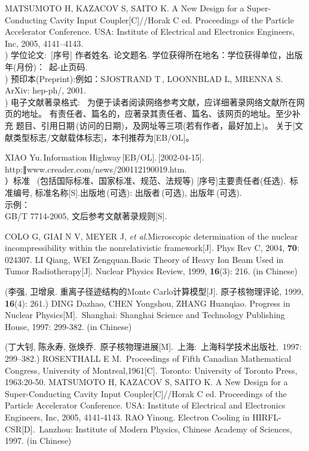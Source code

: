 \documentclass[a4paper,10.0pt,twoside]{npr}
\begin{document}
\begin{multicols}{2}
\noindent
[5] MATSUMOTO H, KAZACOV S, SAITO K. A New Design for a Super-Conducting Cavity Input Coupler[C]//Horak C ed. Proceedings of the Particle Accelerator Conference. USA: Institute of Electrical and Electronics Engineers, Inc, 2005, 4141--4143.
\\
) 学位论文\cite{master:cn}:\song ~[序号]
作者姓名. 论文题名.
学位获得所在地名：学位获得单位，出版年(月份)：\ 起-止页码.\\
) 预印本\cite{Yuqinben:pc}(Preprint):\song \;例如：SJOSTRAND T\,, LOONNBLAD L, MRENNA S.
ArXiv: hep-ph/, 2001.\\
) 电子文献著录格式\cite{netpaper:pc}:\song
~为便于读者阅读网络参考文献，应详细著录网络文献所在网页的地址。
 有责任者、篇名的，应著录其责任者、篇名、该网页的地址。至少补充
 题目、引用日期\,(访问的日期)，及网址等三项(若有作者，最好加上)。
关于[文献类型标志/文献载体标志]，本刊推荐为[EB/OL]。

\noindent
[8] XIAO Yu.\,Information Highway\,[EB/OL].\,[2002-04-15].
http:∥www.creader.com/news/200112190019.htm.\\
）标准 \song~(包括国际标准、国家标准、规范、法规等)
[序号]主要责任者(任选). \,标准编号, 标准名称[S].\;出版地\,(可选): 出版者\,(可选), 出版年\,(可选).\\
示例：\\
\noindent
[9] GB/T 7714-2005, 文后参考文献著录规则[S].

\vspace*{5mm}
\linespread{1.5}
\begin{thebibliography}{90}   %
\liuhao\rm\song

  COLO G, GIAI N V, MEYER J, \emph{et al}.Microscopic determination of the nuclear incompressibility within the nonrelativistic framework[J]. Phys Rev C, 2004, \textbf{70}: 024307.
  LI Qiang, WEI Zengquan.Basic Theory of Heavy Ion Beam Used in Tumor Radiotherapy[J]. Nuclear Physics
Review, 1999, \textbf{16}(3): 216. (in Chinese)

 (李强, 卫增泉. 重离子径迹结构的Monte Carlo计算模型[J]. 原子核物理评论, 1999, \textbf{16}(4): 261.)
DING Dazhao, CHEN Yongshou, ZHANG Huanqiao. Progress in Nuclear
Physics[M].\ Shanghai: Shanghai Science and Technology Publishing
House, 1997: 299-382. (in Chinese)

 (丁大钊, 陈永寿, 张焕乔.\ 原子核物理进展[M].\ 上海:\ 上海科学技术出版社,\ 1997: 299--382.)
  ROSENTHALL E M.~Proceedings of Fifth Canadian Mathematical Congress, University of Montreal,1961[C]. Toronto: University of Toronto Press, 1963:20-50.
 MATSUMOTO H, KAZACOV S, SAITO K. A New Design for a Super-Conducting Cavity Input Coupler[C]//Horak C ed. Proceedings of the Particle Accelerator Conference. USA: Institute of Electrical and Electronics Engineers, Inc, 2005, 4141-4143.
 RAO Yinong. Electron Cooling in HIRFL-CSR[D].\ Lanzhou: Institute of Modern Physics, Chinese Academy of Sciences, 1997. (in  Chinese)


\end{thebibliography}
\end{multicols}
\end{document}
